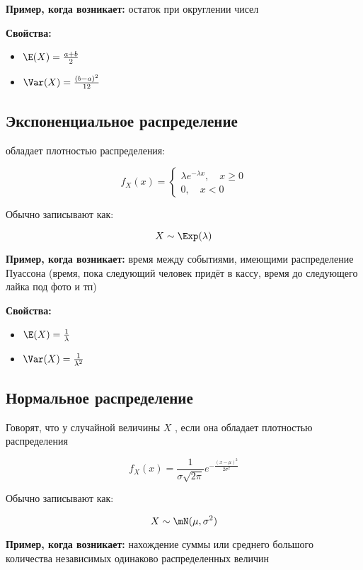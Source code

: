 \textbf{Пример, когда возникает:} остаток при округлении чисел

\textbf{Свойства:}

\begin{itemize} 
\item $\E(X) = \frac{a + b}{2}$
\item $\Var(X) = \frac{(b - a)^2}{12}$
\end{itemize} 


\subsection*{Экспоненциальное распределение}

 обладает плотностью распределения: 

$$
f_X(x) =\begin{cases}
\lambda e^{- \lambda x}, \quad x \ge 0  \\
0, \quad x < 0
\end{cases}
$$

Обычно записывают как:

$$
X \sim \Exp(\lambda)
$$

\textbf{Пример, когда возникает:} время между событиями, имеющими распределение Пуассона (время, пока следующий человек придёт в кассу, время до следующего лайка под фото и тп)

\textbf{Свойства:}

\begin{itemize} 
\item $\E(X) = \frac{1}{\lambda}$
\item $\Var(X) = \frac{1}{\lambda^2}$
\end{itemize} 

\subsection*{Нормальное распределение}

Говорят, что у случайной величины $X$ , если она обладает плотностью распределения

$$
f_{X}(x) = \frac{1}{\sigma \sqrt{2 \pi}} e^{-\tfrac{(x - \mu)^2}{2\sigma^2}}
$$

Обычно записывают как:

$$
X \sim \mN(\mu, \sigma^2)
$$

\textbf{Пример, когда возникает:} нахождение суммы или среднего большого количества независимых одинаково распределенных величин

